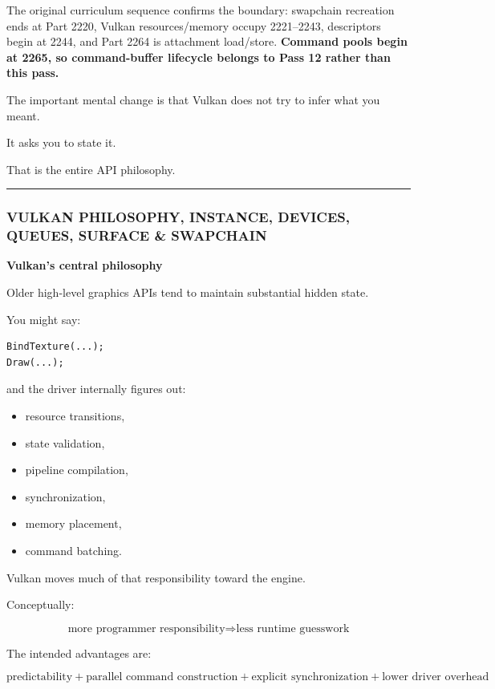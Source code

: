 The original curriculum sequence confirms the boundary: swapchain recreation ends at Part 2220, Vulkan resources/memory occupy 2221--2243, descriptors begin at 2244, and Part 2264 is attachment load/store. \textbf{Command pools begin at 2265, so command-buffer lifecycle belongs to Pass 12 rather than this pass.}

The important mental change is that Vulkan does not try to infer what you meant.

It asks you to state it.

That is the entire API philosophy.

\begin{center}\rule{0.5\linewidth}{0.5pt}\end{center}

\subsubsection{VULKAN PHILOSOPHY, INSTANCE, DEVICES, QUEUES, SURFACE \& SWAPCHAIN}\label{vulkan-philosophy-instance-devices-queues-surface-swapchain}

\textbf{Vulkan's central philosophy}

Older high-level graphics APIs tend to maintain substantial hidden state.

You might say:

\begin{verbatim}
BindTexture(...);
Draw(...);
\end{verbatim}

and the driver internally figures out:

\begin{itemize}
\tightlist
\item
  resource transitions,
\item
  state validation,
\item
  pipeline compilation,
\item
  synchronization,
\item
  memory placement,
\item
  command batching.
\end{itemize}

Vulkan moves much of that responsibility toward the engine.

Conceptually:

\[
\boxed{
\text{more programmer responsibility}
\Longrightarrow
\text{less runtime guesswork}
}
\]

The intended advantages are:

\[
\boxed{
\text{predictability}
+
\text{parallel command construction}
+
\text{explicit synchronization}
+
\text{lower driver overhead}
}
\]

